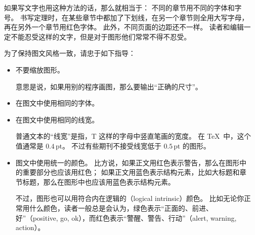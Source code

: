 如果写文字也用这种方法的话，那么就相当于：
不同的章节用不同的字体和字号。
书写定理时，在某些章节中都加了下划线，在另一个章节则全用大写字母，再在另外一个章节用红色字体。
此外，不同页面的边距还不一样。
读者和编辑一定不能忍受这样的文字，但是对于图形他们常常不得不忍受。

为了保持图文风格一致，请忠于如下指导：

\eohs

\begin{itemize}
\item
  不要缩放图形。

  意思是说，如果用别的程序画图，那么要输出“正确的尺寸”。
\item
  在图文中使用相同的字体。
\item
  在图文中使用相同的线宽。

  普通文本的“线宽”是指，T 这样的字母中竖直笔画的宽度。
  在 \TeX\ 中，这个值通常是 $0.4\,\mathrm{pt}$。
  不过有些期刊不接受线宽低于 $0.5\,\mathrm{pt}$ 的图形。
\item
  图文中使用统一的颜色。
  比方说，如果正文用红色表示警告，那么在图形中的重要部分也应该用红色；
  如果正文用蓝色表示结构元素，比如大标题和章节标题，那么在图形中也应该用蓝色表示结构元素。

  不过，图形也可以用符合内在逻辑的（logical intrinsic）颜色。
  比如无论你正常用什么颜色，读者一般总是会认为，绿色表示“正面的、前进、好”（positive, go, ok），而红色表示“警醒、警告、行动”（alert, warning, action）。
\end{itemize}

